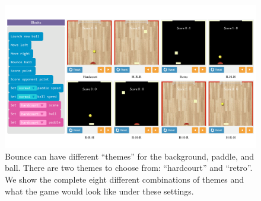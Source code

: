 \documentclass{article}
\begin{document}
\begin{figure}[ht]
  \centering
  \includegraphics[width=0.85\linewidth]{images/thematic-invariance-new.pdf}
  \caption{Bounce can have different ``themes'' for the background, paddle, and ball. There are two themes to choose from: ``hardcourt'' and ``retro''. We show the complete eight different combinations of themes and what the game would look like under these settings.}
  \label{fig:theme-invars}
\end{figure}
\end{document}
